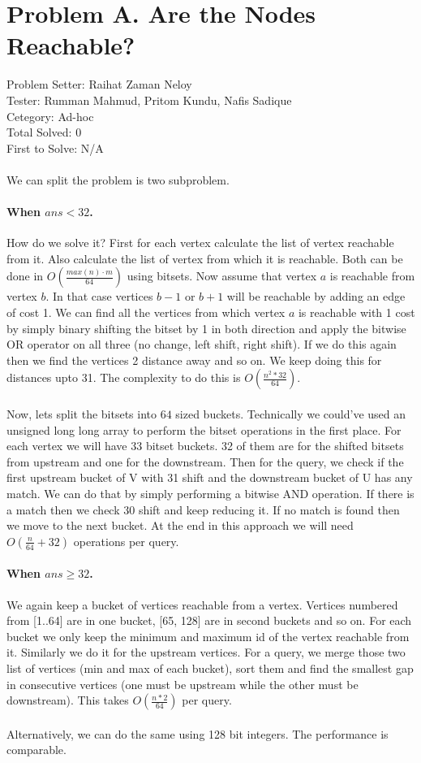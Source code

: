 \section*{Problem A. Are the Nodes Reachable?}
Problem Setter: Raihat Zaman Neloy\\
Tester: Rumman Mahmud, Pritom Kundu, Nafis Sadique\\
Cetegory: Ad-hoc\\
Total Solved: 0 \\
First to Solve: N/A \\
\\
We can split the problem is two subproblem.
\paragraph*{When $ans < 32$.}
How do we solve it? First for each vertex calculate the list of vertex reachable from it. Also
calculate the list of vertex from which it is reachable. Both can be done in $O(\frac{max(n) \cdot m}{64})$ using bitsets.
Now assume that vertex $a$ is reachable from vertex $b$. In that case vertices $b-1$ or $b+1$ will be reachable by 
adding an edge of cost 1. We can find all the vertices from which vertex $a$ is reachable with 1 cost by simply
binary shifting the bitset by 1 in both direction and apply the bitwise OR operator on all three (no change, left shift, right shift).
If we do this again then we find the vertices 2 distance away and so on. We keep doing this for distances upto 31. The
complexity to do this is $O(\frac{n^2*32}{64})$. 
\\
\\
Now, lets split the bitsets into $64$ sized buckets. Technically we could've used an unsigned long long array to perform
the bitset operations in the first place. For each vertex we will have 33 bitset buckets. 32 of them are for
the shifted bitsets from upstream and one for the downstream.
Then for the query, we check if the first upstream bucket of V with 31 shift and the downstream bucket of U has any match. We 
can do that by simply performing a bitwise AND operation. If there is a match then we check 30 shift and keep reducing it. If 
no match is found then we move to the next bucket. At the end in this approach we will need $O(\frac{n}{64}+32)$ operations
per query.
\paragraph*{When $ans \ge 32$.}
We again keep a bucket of vertices reachable from a vertex. Vertices numbered from [1..64] are in one bucket, [65, 128] are 
in second buckets and so on. For each bucket we only keep the minimum and maximum id of the vertex reachable from it. Similarly we do it 
for the upstream vertices. For a query, we merge those two list of vertices (min and max of each bucket), sort them and find the
smallest gap in consecutive vertices (one must be upstream while the other must be downstream). This takes $O(\frac{n*2}{64})$ per
query.
\\ 
\\
Alternatively, we can do the same using 128 bit integers. The performance is comparable.
